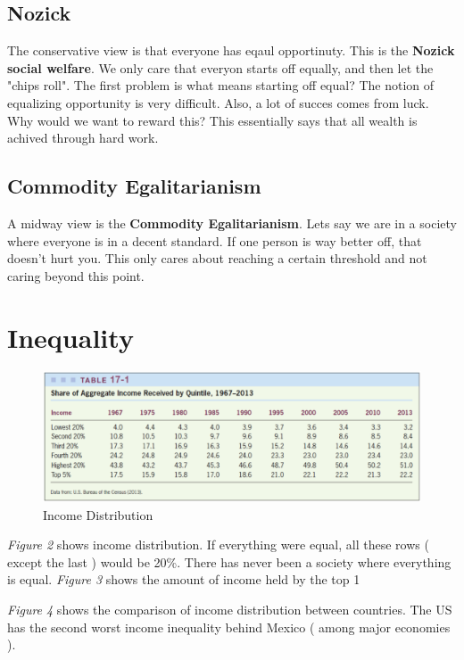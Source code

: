 \documentclass{article}
\begin{document}
\subsection{ Nozick }

The conservative view is that everyone has eqaul opportinuty. This is the
\textbf{Nozick social welfare}. We only care that everyon starts off equally,
and then let the "chips roll". The first problem is what means starting off
equal? The notion of equalizing opportunity is very difficult. Also, a lot of
succes comes from luck. Why would we want to reward this? This essentially says
that all wealth is achived through hard work.

\subsection{ Commodity Egalitarianism }

A midway view is the \textbf{Commodity Egalitarianism}. Lets say we are in a
society where everyone is in a decent standard. If one person is way better off,
that doesn't hurt you. This only cares about reaching a certain threshold and
not caring beyond this point.

\section{ Inequality }

\begin{figure}[H]
    \centering
    \includegraphics[scale=0.45]{"Income Distribution"}
    \caption{Income Distribution}
\end{figure}

\textit{Figure 2} shows income distribution. If everything were equal, all these
rows ( except the last ) would be 20\%. There has never been a society where
everything is equal. \textit{Figure 3} shows the amount of income held by the
top 1%

\textit{Figure 4} shows the comparison of income distribution between countries.
The US has the second worst income inequality behind Mexico ( among major
economies ). 
\end{document}

